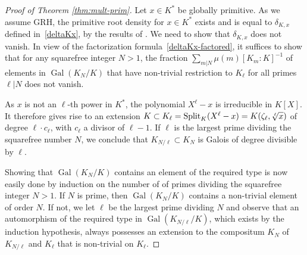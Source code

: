 \documentclass{amsart}
\theoremstyle{plain}
\theoremstyle{definition}
\DeclareMathOperator{\Gal}{Gal}
\DeclareMathOperator{\Split}{Split}
\begin{document}
\begin{proof}[Proof of Theorem \ref{thm:mult-prim}]
Let $x\in K^*$ be globally primitive.
As we assume GRH, the primitive root density for $x\in K^*$ exists 
and is equal to $\delta_{K,x}$ defined in~\eqref{deltaKx}, by the results of \cite{Lenstra}.
We need to show that $\delta_{K,x}$ does not vanish.
In view of the factorization 
formula~\eqref{deltaKx-factored}, it suffices to show that 
for any squarefree integer $N>1$, the fraction
$\sum_{m|N} \mu(m)[K_m:K]^{-1}$ of elements in 
$\Gal(K_N/K)$ that have non-trivial restriction to $K_\ell$ for all primes $\ell|N$ does not vanish.

As $x$ is not an $\ell$-th power in $K^*$, the polynomial $X^\ell-x$ is irreducible in $K[X]$.
It therefore gives rise to an extension 
$K\subset K_\ell=\Split_K(X^\ell-x)=K(\zeta_\ell,\root \ell \of x)$ 
of degree $\ell\cdot c_\ell$, with $c_\ell$ a divisor of $\ell-1$. 
If $\ell$ is the largest prime dividing the squarefree number $N$, we conclude that 
$K_{N/\ell}\subset K_N$ is Galois of degree divisible by  $\ell$.

Showing that $\Gal(K_N/K)$ contains an element of the required type is now easily done by induction on the number of of primes dividing the squarefree integer $N>1$. 
If $N$ is prime, then $\Gal(K_N/K)$ contains a non-trivial element of order $N$.
If not, we let $\ell$ be the largest prime dividing $N$ and observe that
an automorphism of the required type in $\Gal(K_{N/\ell}/K)$, 
which exists by the induction hypothesis,
always possesses an extension to the compositum $K_N$ of $K_{N/\ell}$ and $K_\ell$ that is non-trivial on $K_\ell$.
\end{proof}
\end{document}
